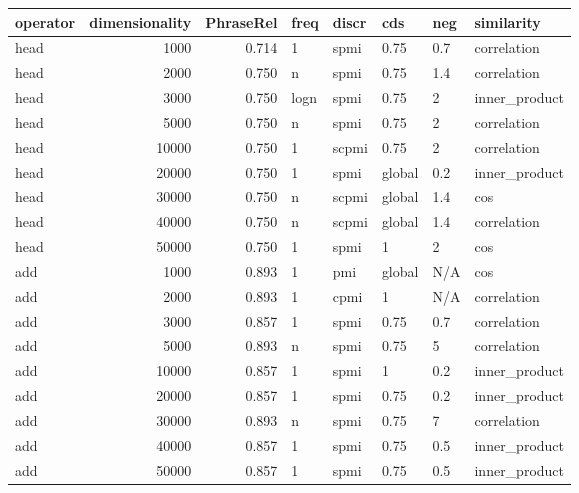\begin{tabular}{lrrlllll}
\toprule
operator &  dimensionality &  PhraseRel &  freq &  discr &     cds &  neg &     similarity \\
\midrule
    head &            1000 &      0.714 &     1 &   spmi &    0.75 &  0.7 &    correlation \\
    head &            2000 &      0.750 &     n &   spmi &    0.75 &  1.4 &    correlation \\
    head &            3000 &      0.750 &  logn &   spmi &    0.75 &    2 &  inner\_product \\
    head &            5000 &      0.750 &     n &   spmi &    0.75 &    2 &    correlation \\
    head &           10000 &      0.750 &     1 &  scpmi &    0.75 &    2 &    correlation \\
    head &           20000 &      0.750 &     1 &   spmi &  global &  0.2 &  inner\_product \\
    head &           30000 &      0.750 &     n &  scpmi &  global &  1.4 &            cos \\
    head &           40000 &      0.750 &     n &  scpmi &  global &  1.4 &    correlation \\
    head &           50000 &      0.750 &     1 &   spmi &       1 &    2 &            cos \\
     add &            1000 &      0.893 &     1 &    pmi &  global &  N/A &            cos \\
     add &            2000 &      0.893 &     1 &   cpmi &       1 &  N/A &    correlation \\
     add &            3000 &      0.857 &     1 &   spmi &    0.75 &  0.7 &    correlation \\
     add &            5000 &      0.893 &     n &   spmi &    0.75 &    5 &    correlation \\
     add &           10000 &      0.857 &     1 &   spmi &       1 &  0.2 &  inner\_product \\
     add &           20000 &      0.857 &     1 &   spmi &    0.75 &  0.2 &  inner\_product \\
     add &           30000 &      0.893 &     n &   spmi &    0.75 &    7 &    correlation \\
     add &           40000 &      0.857 &     1 &   spmi &    0.75 &  0.5 &  inner\_product \\
     add &           50000 &      0.857 &     1 &   spmi &    0.75 &  0.5 &  inner\_product \\

\end{tabular}
